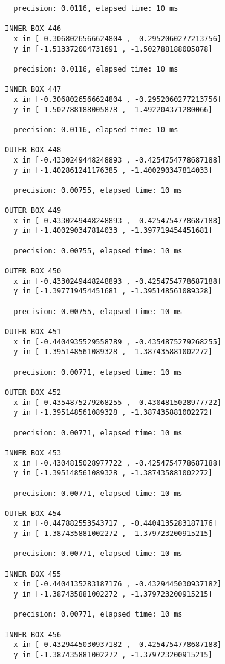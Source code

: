 \begin{verbatim}
  precision: 0.0116, elapsed time: 10 ms

INNER BOX 446
  x in [-0.3068026566624804 , -0.2952060277213756]
  y in [-1.513372004731691 , -1.502788188005878]

  precision: 0.0116, elapsed time: 10 ms

INNER BOX 447
  x in [-0.3068026566624804 , -0.2952060277213756]
  y in [-1.502788188005878 , -1.492204371280066]

  precision: 0.0116, elapsed time: 10 ms

OUTER BOX 448
  x in [-0.4330249448248893 , -0.4254754778687188]
  y in [-1.402861241176385 , -1.400290347814033]

  precision: 0.00755, elapsed time: 10 ms

OUTER BOX 449
  x in [-0.4330249448248893 , -0.4254754778687188]
  y in [-1.400290347814033 , -1.397719454451681]

  precision: 0.00755, elapsed time: 10 ms

OUTER BOX 450
  x in [-0.4330249448248893 , -0.4254754778687188]
  y in [-1.397719454451681 , -1.395148561089328]

  precision: 0.00755, elapsed time: 10 ms

OUTER BOX 451
  x in [-0.4404935529558789 , -0.4354875279268255]
  y in [-1.395148561089328 , -1.387435881002272]

  precision: 0.00771, elapsed time: 10 ms

OUTER BOX 452
  x in [-0.4354875279268255 , -0.4304815028977722]
  y in [-1.395148561089328 , -1.387435881002272]

  precision: 0.00771, elapsed time: 10 ms

INNER BOX 453
  x in [-0.4304815028977722 , -0.4254754778687188]
  y in [-1.395148561089328 , -1.387435881002272]

  precision: 0.00771, elapsed time: 10 ms

OUTER BOX 454
  x in [-0.447882553543717 , -0.4404135283187176]
  y in [-1.387435881002272 , -1.379723200915215]

  precision: 0.00771, elapsed time: 10 ms

INNER BOX 455
  x in [-0.4404135283187176 , -0.4329445030937182]
  y in [-1.387435881002272 , -1.379723200915215]

  precision: 0.00771, elapsed time: 10 ms

INNER BOX 456
  x in [-0.4329445030937182 , -0.4254754778687188]
  y in [-1.387435881002272 , -1.379723200915215]


\end{verbatim}
